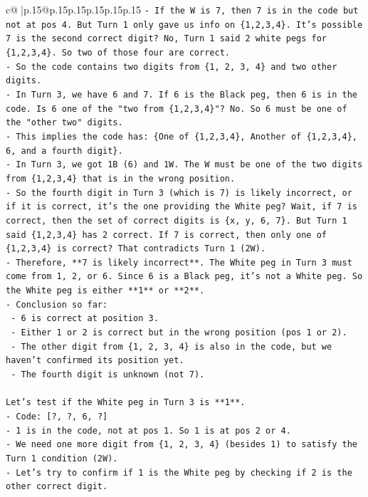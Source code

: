 \documentclass{article}
\begin{document}
{\begin{supertabular}{c@{$\;$}|p{.15\linewidth}@{}p{.15\linewidth}p{.15\linewidth}p{.15\linewidth}p{.15\linewidth}p{.15\linewidth}}
{{{\texttt{{-} If the W is 7, then 7 is in the code but not at pos 4. But Turn 1 only gave us info on \{1,2,3,4\}. It's possible 7 is the second correct digit? No, Turn 1 said 2 white pegs for \{1,2,3,4\}. So two of those four are correct.} \\
\texttt{{-} So the code contains two digits from \{1, 2, 3, 4\} and two other digits.} \\
\texttt{{-} In Turn 3, we have 6 and 7. If 6 is the Black peg, then 6 is in the code. Is 6 one of the "two from \{1,2,3,4\}"? No. So 6 must be one of the "other two" digits.} \\
\texttt{{-} This implies the code has: \{One of \{1,2,3,4\}, Another of \{1,2,3,4\}, 6, and a fourth digit\}.} \\
\texttt{{-} In Turn 3, we got 1B (6) and 1W. The W must be one of the two digits from \{1,2,3,4\} that is in the wrong position.} \\
\texttt{{-} So the fourth digit in Turn 3 (which is 7) is likely incorrect, or if it is correct, it's the one providing the White peg? Wait, if 7 is correct, then the set of correct digits is \{x, y, 6, 7\}. But Turn 1 said \{1,2,3,4\} has 2 correct. If 7 is correct, then only one of \{1,2,3,4\} is correct? That contradicts Turn 1 (2W).} \\
\texttt{{-} Therefore, **7 is likely incorrect**. The White peg in Turn 3 must come from 1, 2, or 6. Since 6 is a Black peg, it's not a White peg. So the White peg is either **1** or **2**.} \\
\texttt{{-} Conclusion so far:} \\
\texttt{  {-} 6 is correct at position 3.} \\
\texttt{  {-} Either 1 or 2 is correct but in the wrong position (pos 1 or 2).} \\
\texttt{  {-} The other digit from \{1, 2, 3, 4\} is also in the code, but we haven't confirmed its position yet.} \\
\texttt{  {-} The fourth digit is unknown (not 7).} \\
\\ 
\texttt{Let's test if the White peg in Turn 3 is **1**.} \\
\texttt{{-} Code: {[}?, ?, 6, ?{]}} \\
\texttt{{-} 1 is in the code, not at pos 1. So 1 is at pos 2 or 4.} \\
\texttt{{-} We need one more digit from \{1, 2, 3, 4\} (besides 1) to satisfy the Turn 1 condition (2W).} \\
\texttt{{-} Let's try to confirm if 1 is the White peg by checking if 2 is the other correct digit.} \\
}}}
\end{supertabular}}
\end{document}
